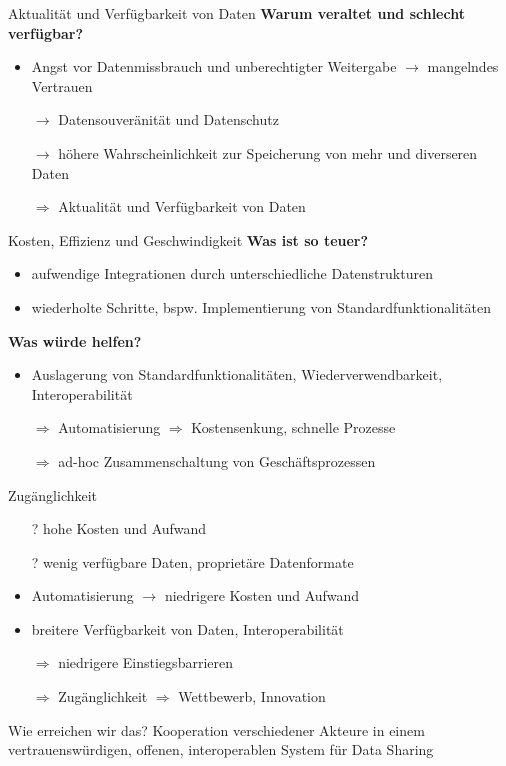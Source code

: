 \begin{frame}{Aktualität und Verfügbarkeit von Daten}
    \textbf{Warum veraltet und schlecht verfügbar?}
    \begin{itemize}
        \item Angst vor Datenmissbrauch und unberechtigter Weitergabe $\to$ mangelndes Vertrauen
        \item[$\to$] Datensouveränität und Datenschutz
        \item[$\to$] höhere Wahrscheinlichkeit zur Speicherung von mehr und diverseren Daten
        \item[$\Rightarrow$] Aktualität und Verfügbarkeit von Daten
    \end{itemize}
\end{frame}


\begin{frame}{Kosten, Effizienz und Geschwindigkeit}
    \textbf{Was ist so teuer?}
    \begin{itemize}
        \item aufwendige Integrationen durch unterschiedliche Datenstrukturen
        \item wiederholte Schritte, bspw. Implementierung von Standardfunktionalitäten
    \end{itemize}

    \textbf{Was würde helfen?}
    \begin{itemize}
        \item Auslagerung von Standardfunktionalitäten, Wiederverwendbarkeit, Interoperabilität
        \item[$\Rightarrow$] Automatisierung $\Rightarrow$ Kostensenkung, schnelle Prozesse
        \item[$\Rightarrow$] ad-hoc Zusammenschaltung von Geschäftsprozessen
    \end{itemize}
\end{frame}


\begin{frame}{Zugänglichkeit}
    \begin{itemize}
        \item[?] hohe Kosten und Aufwand
        \item[?] wenig verfügbare Daten, proprietäre Datenformate
    \end{itemize}

    \begin{itemize}
        \item Automatisierung $\to$ niedrigere Kosten und Aufwand
        \item breitere Verfügbarkeit von Daten, Interoperabilität
        \item[$\Rightarrow$] niedrigere Einstiegsbarrieren
        \item[$\Rightarrow$] Zugänglichkeit $\Rightarrow$ Wettbewerb, Innovation
    \end{itemize}
\end{frame}


\begin{frame}{Wie erreichen wir das?}
    \Large Kooperation verschiedener Akteure in einem vertrauenswürdigen, offenen, interoperablen System für Data Sharing
\end{frame}